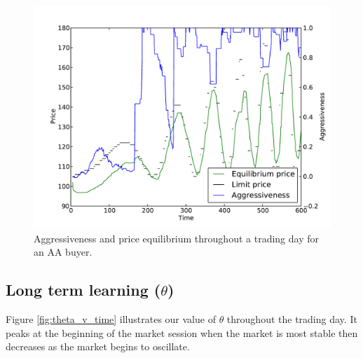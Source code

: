 \documentclass[preprint]{acm_proc_article-sp} %
\begin{document}
\begin{figure}[H] 
\centering
\includegraphics[width=\columnwidth]{graphs_and_stats/graph_aggressiveness_vs_price.pdf}
\caption{Aggressiveness and price equilibrium throughout a trading day for an AA
  buyer.}
  \label{fig:avtime}
\end{figure}



\subsection{Long term learning ($\theta$)} \label{sec:evaluation_theta}
Figure \ref{fig:theta_v_time} illustrates our value of $\theta$ throughout the
trading day. It peaks at the beginning of the market session when the market is
most stable then decreases as the market begins to oscillate.
\end{document}
